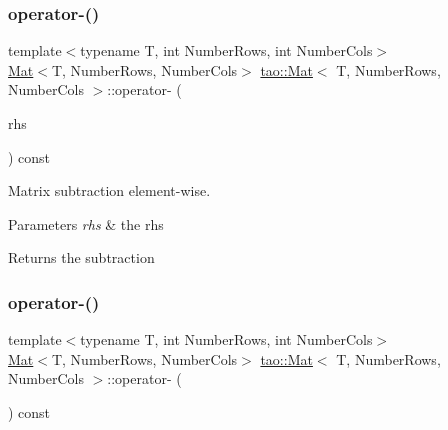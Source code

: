 \subsubsection{\texorpdfstring{operator-\/()}{operator-()}\hspace{0.1cm}{\footnotesize\ttfamily [1/2]}}
{\footnotesize\ttfamily template$<$typename T, int Number\+Rows, int Number\+Cols$>$ \\
\mbox{\hyperlink{classtao_1_1_mat}{Mat}}$<$T, Number\+Rows, Number\+Cols$>$ \mbox{\hyperlink{classtao_1_1_mat}{tao\+::\+Mat}}$<$ T, Number\+Rows, Number\+Cols $>$\+::operator-\/ (\begin{DoxyParamCaption}\item[{const \mbox{\hyperlink{classtao_1_1_mat}{Mat}}$<$ T, Number\+Rows, Number\+Cols $>$ \&}]{rhs }\end{DoxyParamCaption}) const\hspace{0.3cm}{\ttfamily [inline]}}



Matrix subtraction element-\/wise. 


\begin{DoxyParams}{Parameters}
{\em rhs} & the rhs \\
\hline
\end{DoxyParams}
\begin{DoxyReturn}{Returns}
the subtraction 
\end{DoxyReturn}
\mbox{\label{classtao_1_1_mat_a0a24345ea0ff734cfcf6dabc5a7d1089}} 
\subsubsection{\texorpdfstring{operator-\/()}{operator-()}\hspace{0.1cm}{\footnotesize\ttfamily [2/2]}}
{\footnotesize\ttfamily template$<$typename T, int Number\+Rows, int Number\+Cols$>$ \\
\mbox{\hyperlink{classtao_1_1_mat}{Mat}}$<$T, Number\+Rows, Number\+Cols$>$ \mbox{\hyperlink{classtao_1_1_mat}{tao\+::\+Mat}}$<$ T, Number\+Rows, Number\+Cols $>$\+::operator-\/ (\begin{DoxyParamCaption}{ }\end{DoxyParamCaption}) const\hspace{0.3cm}{\ttfamily [inline]}}



